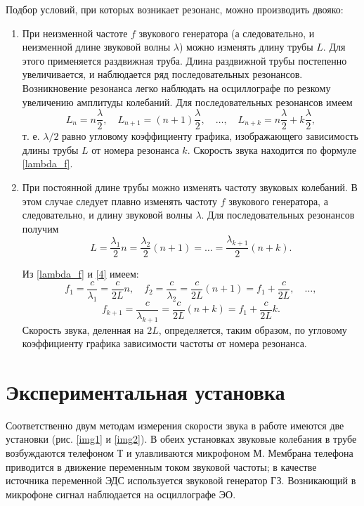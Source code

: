 \documentclass[a4paper,12pt]{article} %
\begin{document}
Подбор условий, при которых возникает резонанс, можно производить двояко:
\begin{enumerate}
	\item При неизменной частоте $ f $ звукового генератора (а следовательно, и неизменной длине звуковой волны $ \lambda $) можно изменять длину трубы $ L $. Для этого применяется раздвижная труба. Длина раздвижной трубы постепенно увеличивается, и наблюдается ряд последовательных резонансов. Возникновение резонанса легко наблюдать на осциллографе по резкому увеличению амплитуды колебаний. Для последовательных резонансов имеем \begin{equation}\label{first}
	L_n=n\frac{\lambda}{2}, \quad L_{n+1}=(n+1)\frac{\lambda}{2}, \quad \dots, \quad L_{n+k} = n\frac{\lambda}{2}+k\frac{\lambda}{2},
	\end{equation} т. е. $ \lambda/2 $ равно угловому коэффициенту графика, изображающего зависимость длины трубы $ L $ от номера резонанса $ k $. Скорость звука находится по формуле \eqref{lambda_f}.
	\item При постоянной длине трубы можно изменять частоту звуковых колебаний. В этом случае следует плавно изменять частоту $ f $ звукового генератора, а следовательно, и длину звуковой волны $ \lambda $. Для последовательных резонансов получим 
	\begin{equation}\label{4}
	L=\frac{\lambda_1}{2}n=\frac{\lambda_2}{2}(n+1)=\dots=\frac{\lambda_{k+1}}{2}(n+k).
	\end{equation}
	
	Из \eqref{lambda_f} и \eqref{4} имеем:
	\[ f_1=\frac{c}{\lambda_1}=\frac{c}{2L}n, \quad f_2=\frac{c}{\lambda_2}=\frac{c}{2L}(n+1)=f_1+\frac{c}{2L},\quad \dots, \]
	\begin{equation}\label{5}
	f_{k+1}=\frac{c}{\lambda_{k+1}}=\frac{c}{2L}(n+k)=f_1+\frac{c}{2L}k.
	\end{equation}
	Скорость звука, деленная на $ 2L $, определяется, таким образом, по угловому коэффициенту графика зависимости частоты от номера резонанса.
\end{enumerate}

\section{Экспериментальная установка}

Соответственно двум методам измерения скорости звука в работе имеются две установки (рис. \ref{img1} и \ref{img2}). В обеих установках звуковые колебания в трубе возбуждаются телефоном Т и улавливаются микрофоном М. Мембрана телефона приводится в движение переменным током звуковой частоты; в качестве источника переменной ЭДС используется звуковой генератор ГЗ. Возникающий в микрофоне сигнал наблюдается на осциллографе ЭО.
\end{document}
